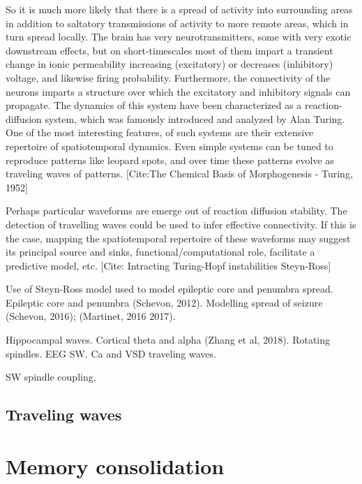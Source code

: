 So it is much more likely that there is a spread of activity into surrounding areas in addition to saltatory transmissions of activity to more remote areas, which in turn spread locally.
The brain has very neurotransmitters, some with very exotic downstream effects, but on short-timescales most of them impart a transient change in ionic permeability increasing (excitatory) or decreases (inhibitory) voltage, and likewise firing probability. Furthermore, the connectivity of the neurons imparts a structure over which the excitatory and inhibitory signals can propagate. The dynamics of this system have been characterized as a reaction-diffusion system, which was famously introduced and analyzed by Alan Turing. One of the most interesting features, of such systems are their extensive repertoire of spatiotemporal dynamics. Even simple systems can be tuned to reproduce patterns like leopard spots, and over time these patterns evolve as traveling waves of patterns. [Cite:The Chemical Basis of Morphogenesis - Turing, 1952]

Perhaps particular waveforms are emerge out of reaction diffusion stability. The detection of travelling waves could be used to infer effective connectivity. If this is the case, mapping the spatiotemporal repertoire of these waveforms may suggest its principal source and sinks, functional/computational role, facilitate a predictive model, etc. [Cite: Intracting Turing-Hopf instabilities Steyn-Ross]

Use of Steyn-Ross model used to model epileptic core and penumbra spread. Epileptic core and penumbra (Schevon, 2012). Modelling spread of seizure (Schevon, 2016); (Martinet, 2016 2017).

Hippocampal waves. Cortical theta and alpha (Zhang et al, 2018).
Rotating spindles.
EEG SW. Ca and VSD traveling waves.

SW spindle coupling.

\subsection*{Traveling waves}

\section*{Memory consolidation}
